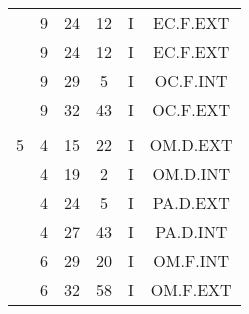 \documentclass[12pt, a4paper]{article}
\begin{document}
\begin{multicols}{3}
{\begin{tabular}{c c c c c c}
	 	 	 	 & 9 & 24 & 12 & I & EC.F.EXT\\%
	 	 	 	 & 9 & 24 & 12 & I & EC.F.EXT\\%
	 	 	 	 & 9 & 29 & 5 & I & OC.F.INT\\%
	 	 	 	 & 9 & 32 & 43 & I & OC.F.EXT\\%
	 	 	 	 & & & & & \\%
	 	 	 	5 & 4 & 15 & 22 & I & OM.D.EXT\\%
	 	 	 	 & 4 & 19 & 2 & I & OM.D.INT\\%
	 	 	 	 & 4 & 24 & 5 & I & PA.D.EXT\\%
	 	 	 	 & 4 & 27 & 43 & I & PA.D.INT\\%
	 	 	 	 & 6 & 29 & 20 & I & OM.F.INT\\%
	 	 	 	 & 6 & 32 & 58 & I & OM.F.EXT\\%
	 	 \end{tabular}
 	}
\end{multicols}
\end{document}
